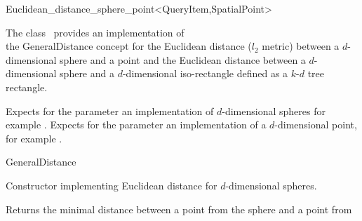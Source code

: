 

\begin{ccRefClass}{Euclidean_distance_sphere_point<QueryItem,SpatialPoint>}  %


\ccDefinition
  
The class \ccRefName\ provides an implementation of \\
the GeneralDistance concept
for the Euclidean distance ($l_2$ metric) between a $d$-dimensional sphere and a point and 
the Euclidean distance between a $d$-dimensional sphere
and a $d$-dimensional iso-rectangle defined as a $k$-$d$ tree rectangle.


\ccParameters

Expects for the parameter 
an implementation of $d$-dimensional spheres
for example .
Expects for the parameter  an implementation
of a $d$-dimensional point, for example .

\ccIsModel

GeneralDistance

\ccTypes


\ccCreation
{}  %


{Constructor implementing Euclidean distance for
$d$-dimensional spheres.}

\ccOperations


{Returns the minimal distance between a point from the sphere  and a point from
}


\end{ccRefClass}
